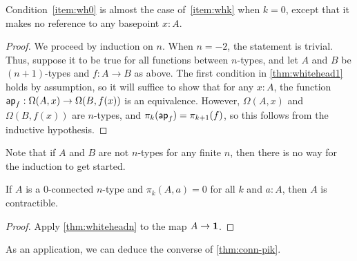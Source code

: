 \noindent
Condition~\ref{item:wh0} is almost the case of~\ref{item:whk} when $k=0$, except that it makes no reference to any basepoint $x:A$.

\begin{proof}
  We proceed by induction on $n$.
  When $n=-2$, the statement is trivial.
  Thus, suppose it to be true for all functions between $n$-types, and let $A$ and $B$ be $(n+1)$-types and $f:A\to B$ as above.
  The first condition in \autoref{thm:whitehead1} holds by assumption, so it will suffice to show that for any $x:A$, the function $\mathsf{ap}_{f}: \Omega(A,x) \to \Omega(B,f(x))$ is an equivalence.
  However, $\Omega(A,x)$ and $\Omega(B,f(x))$ are $n$-types, and $\pi_k(\mathsf{ap}_{f}) = \pi_{k+1}(f)$, so this follows from the inductive hypothesis.
\end{proof}

Note that if $A$ and $B$ are not $n$-types for any finite $n$, then there is no way for the induction to get started.

\begin{cor}\label{thm:whitehead-contr}
  If $A$ is a $0$-connected $n$-type and $\pi_k(A,a)=0$ for all $k$ and $a:A$, then $A$ is contractible.
\end{cor}
\begin{proof}
  Apply \autoref{thm:whiteheadn} to the map $A\to\mathbf{1}$.
\end{proof}

As an application, we can deduce the converse of \autoref{thm:conn-pik}.

